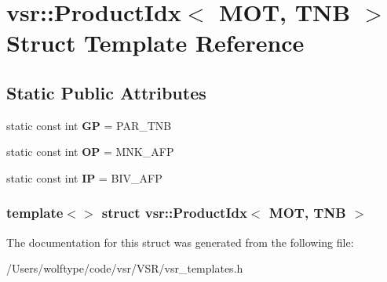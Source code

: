 \hypertarget{structvsr_1_1_product_idx_3_01_m_o_t_00_01_t_n_b_01_4}{\section{vsr\-:\-:Product\-Idx$<$ M\-O\-T, T\-N\-B $>$ Struct Template Reference}
\label{structvsr_1_1_product_idx_3_01_m_o_t_00_01_t_n_b_01_4}
}
\subsection*{Static Public Attributes}
\begin{DoxyCompactItemize}
\item 
\hypertarget{structvsr_1_1_product_idx_3_01_m_o_t_00_01_t_n_b_01_4_a5b32c754be1a136c0a05262e6d6cc4c3}{static const int {\bfseries G\-P} = P\-A\-R\-\_\-\-T\-N\-B}\label{structvsr_1_1_product_idx_3_01_m_o_t_00_01_t_n_b_01_4_a5b32c754be1a136c0a05262e6d6cc4c3}

\item 
\hypertarget{structvsr_1_1_product_idx_3_01_m_o_t_00_01_t_n_b_01_4_acb0e36b7ec074a2bb81337f44248c73e}{static const int {\bfseries O\-P} = M\-N\-K\-\_\-\-A\-F\-P}\label{structvsr_1_1_product_idx_3_01_m_o_t_00_01_t_n_b_01_4_acb0e36b7ec074a2bb81337f44248c73e}

\item 
\hypertarget{structvsr_1_1_product_idx_3_01_m_o_t_00_01_t_n_b_01_4_a29491f0734b47ef9c1963c304e532be9}{static const int {\bfseries I\-P} = B\-I\-V\-\_\-\-A\-F\-P}\label{structvsr_1_1_product_idx_3_01_m_o_t_00_01_t_n_b_01_4_a29491f0734b47ef9c1963c304e532be9}

\end{DoxyCompactItemize}
\subsubsection*{template$<$$>$ struct vsr\-::\-Product\-Idx$<$ M\-O\-T, T\-N\-B $>$}



The documentation for this struct was generated from the following file\-:\begin{DoxyCompactItemize}
\item 
/\-Users/wolftype/code/vsr/\-V\-S\-R/vsr\-\_\-templates.\-h\end{DoxyCompactItemize}
